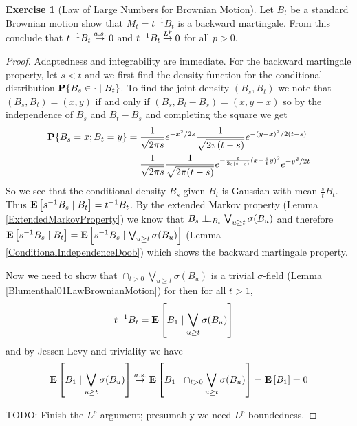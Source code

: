 \documentclass{amsart}
\theoremstyle{remark}
\theoremstyle{definition}
\newtheorem{ex}[thm]{Exercise}
\begin{document}
\begin{ex}[Law of Large Numbers for Brownian Motion]Let $B_t$ be a standard Brownian motion show that $M_t =
  t^{-1}B_t$ is a backward martingale.  From this conclude that
  $t^{-1}B_t \toas 0$ and $t^{-1}B_t \tolp{p} 0$ for all $p > 0$.
\end{ex}
\begin{proof}
Adaptedness and integrability are immediate.  For the backward
martingale property, let $s < t$ and we first find the density function for the
conditional distribution $\cprobability{B_t}{B_s \in \cdot}$.  To find
the joint density $(B_s, B_t)$ we note that $(B_s,B_t) = (x,y)$ if and
only if $(B_s,B_t - B_s) = (x, y - x)$ so by the independence of $B_s$
and $B_t - B_s$ and completing the square we get
\begin{align*}
\probability{B_s = x ; B_t = y} &= \frac{1}{\sqrt{2\pi s} } e^{-x^2/2s}
  \frac{1}{\sqrt{2\pi(t- s)}} e^{-(y-x)^2/2(t-s)} \\
&= \frac{1}{\sqrt{2\pi s}} \frac{1}{\sqrt{2\pi(t- s)}}
    e^{-\frac{t}{2s(t-s)}(x - \frac{s}{t}y)^2} e^{-y^2/2t}
\end{align*}
So we see that the conditional density $B_s$ given $B_t$ is Gaussian
with mean $\frac{s}{t} B_t$.  Thus $\cexpectationlong{B_t}{s^{-1} B_s}
= t^{-1} B_t$.  By the extended Markov property (Lemma
\ref{ExtendedMarkovProperty}) we know that $\cindependent{B_s}{\bigvee_{u \geq t}\sigma(
    B_u)}{B_t}$ and therefore $\cexpectationlong{B_t}{s^{-1} B_s} = \cexpectationlong{\bigvee_{u \geq t}\sigma(
    B_u)}{s^{-1} B_s}$ (Lemma \ref{ConditionalIndependenceDoob}) which
  shows the backward martingale property.

Now we need to show that $\cap_{t > 0} \bigvee_{u \geq t} \sigma(B_u)$
is a trivial $\sigma$-field (Lemma \ref{Blumenthal01LawBrownianMotion})
for then for all $t > 1$, 
\begin{align*}
t^{-1} B_t &= \cexpectationlong{\bigvee_{u \geq t} \sigma(B_u)}{B_1} 
\end{align*}
and by Jessen-Levy and triviality we have 
\begin{align*}
\cexpectationlong{\bigvee_{u \geq t}
  \sigma(B_u)}{B_1} \toas \cexpectationlong{\cap_{t>0} \bigvee_{u \geq t}
  \sigma(B_u)}{B_1} = \expectation{B_1} = 0
\end{align*}

TODO: Finish the $L^p$ argument; presumably we need $L^p$ boundedness.
\end{proof}
\end{document}
